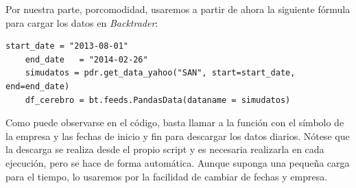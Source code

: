     Por nuestra parte, porcomodidad, usaremos a partir de ahora la siguiente f\'ormula para cargar los datos en \textit{Backtrader}:\\
    
    \begin{lstlisting}[basicstyle=\tiny]
    start_date = "2013-08-01"
    end_date   = "2014-02-26"
    simudatos = pdr.get_data_yahoo("SAN", start=start_date, end=end_date)
    df_cerebro = bt.feeds.PandasData(dataname = simudatos)
    \end{lstlisting}
    
    Como puede observarse en el c\'odigo, basta llamar a la funci\'on con el s\'imbolo de la empresa y las fechas de inicio y fin para descargar los datos diarios. N\'otese que la descarga se realiza desde el propio script y es necesaria realizarla en cada ejecuci\'on, pero se hace de forma autom\'atica. Aunque suponga una peque\~na carga para el tiempo, lo usaremos por la  facilidad de cambiar de fechas y empresa.\\
    
